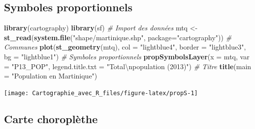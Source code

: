 \documentclass[]{book}
\newenvironment{Shaded}{\begin{snugshade}}{\end{snugshade}}
\newcommand{\KeywordTok}[1]{\textcolor[rgb]{0.13,0.29,0.53}{\textbf{#1}}}
\newcommand{\DataTypeTok}[1]{\textcolor[rgb]{0.13,0.29,0.53}{#1}}
\newcommand{\CharTok}[1]{\textcolor[rgb]{0.31,0.60,0.02}{#1}}
\newcommand{\StringTok}[1]{\textcolor[rgb]{0.31,0.60,0.02}{#1}}
\newcommand{\CommentTok}[1]{\textcolor[rgb]{0.56,0.35,0.01}{\textit{#1}}}
\newcommand{\NormalTok}[1]{#1}
\begin{document}
\subsection{Symboles proportionnels}\label{symboles-proportionnels}

\begin{Shaded}
\begin{Highlighting}[]
\KeywordTok{library}\NormalTok{(cartography)}
\KeywordTok{library}\NormalTok{(sf)}
\CommentTok{# Import des données}
\NormalTok{mtq <-}\StringTok{ }\KeywordTok{st_read}\NormalTok{(}\KeywordTok{system.file}\NormalTok{(}\StringTok{"shape/martinique.shp"}\NormalTok{, }\DataTypeTok{package=}\StringTok{"cartography"}\NormalTok{))}
\CommentTok{# Communes}
\KeywordTok{plot}\NormalTok{(}\KeywordTok{st_geometry}\NormalTok{(mtq), }\DataTypeTok{col =} \StringTok{"lightblue4"}\NormalTok{, }\DataTypeTok{border =} \StringTok{"lightblue3"}\NormalTok{, }
     \DataTypeTok{bg =} \StringTok{"lightblue1"}\NormalTok{)}
\CommentTok{# Symboles proportionnels}
\KeywordTok{propSymbolsLayer}\NormalTok{(}\DataTypeTok{x =}\NormalTok{ mtq, }\DataTypeTok{var =} \StringTok{"P13_POP"}\NormalTok{, }
                 \DataTypeTok{legend.title.txt =} \StringTok{"Total}\CharTok{\textbackslash{}n}\StringTok{population (2013)"}\NormalTok{)}
\CommentTok{# Titre}
\KeywordTok{title}\NormalTok{(}\DataTypeTok{main =} \StringTok{"Population en Martinique"}\NormalTok{)}
\end{Highlighting}
\end{Shaded}

\begin{center}\texttt{[image: Cartographie\_avec\_R\_files/figure-latex/propS-1]} \end{center}

\subsection{Carte choroplèthe}\label{carte-choroplethe}
\end{document}
